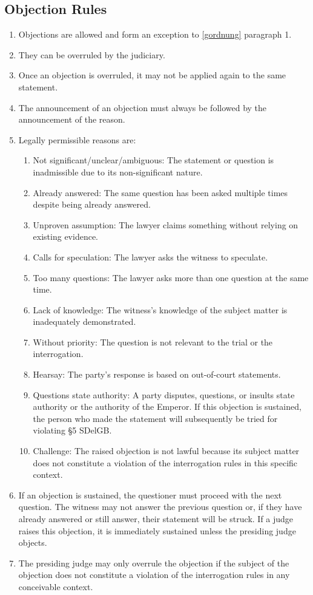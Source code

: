 \documentclass{article}
\begin{document}
\subsection{Objection Rules}\label{eordnung}
\begin{enumerate}[(1)]
    \item Objections are allowed and form an exception to \ref{gordnung} paragraph 1.
    \item They can be overruled by the judiciary.
    \item Once an objection is overruled, it may not be applied again to the same statement.
    \item The announcement of an objection must always be followed by the announcement of the reason.
    \item Legally permissible reasons are:
        \begin{enumerate}[1.]
            \item Not significant/unclear/ambiguous: The statement or question is inadmissible due to its non-significant nature.
            \item Already answered: The same question has been asked multiple times despite being already answered.
            \item Unproven assumption: The lawyer claims something without relying on existing evidence.
            \item Calls for speculation: The lawyer asks the witness to speculate.
            \item Too many questions: The lawyer asks more than one question at the same time.
            \item Lack of knowledge: The witness's knowledge of the subject matter is inadequately demonstrated.
            \item Without priority: The question is not relevant to the trial or the interrogation.
            \item Hearsay: The party's response is based on out-of-court statements.
            \item Questions state authority: A party disputes, questions, or insults state authority or the authority of the Emperor. If this objection is sustained, the person who made the statement will subsequently be tried for violating §5 SDelGB.
            \item Challenge: The raised objection is not lawful because its subject matter does not constitute a violation of the interrogation rules in this specific context.
        \end{enumerate}
    \item If an objection is sustained, the questioner must proceed with the next question. The witness may not answer the previous question or, if they have already answered or still answer, their statement will be struck. If a judge raises this objection, it is immediately sustained unless the presiding judge objects.
    \item The presiding judge may only overrule the objection if the subject of the objection does not constitute a violation of the interrogation rules in any conceivable context.
\end{enumerate}
\end{document}
